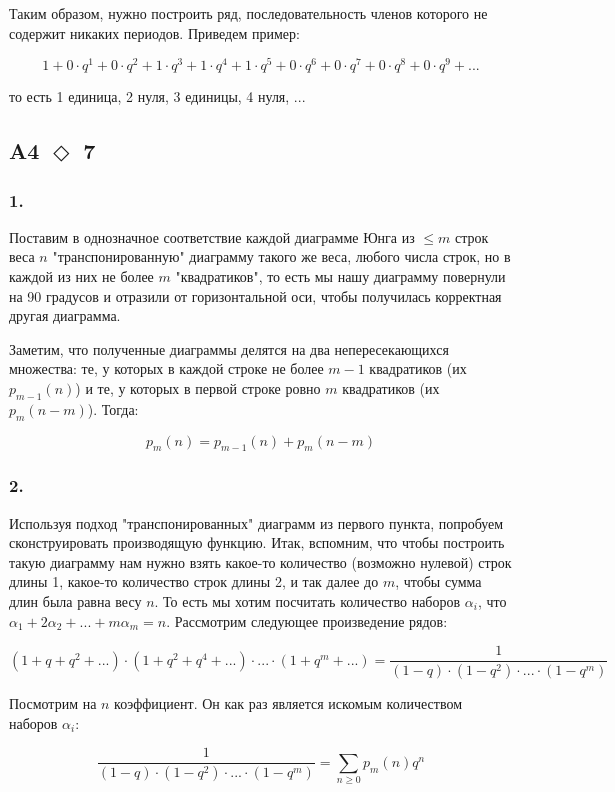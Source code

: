 \documentclass[a4paper]{article}
\newcommand{\task}[2]{A#1 $\Diamond$ #2}
\begin{document}
  Таким образом, нужно построить ряд, последовательность членов которого не содержит никаких периодов. Приведем пример:

  $$1 + 0 \cdot q^1 + 0 \cdot q^2 + 1 \cdot q^3 + 1 \cdot q^4 + 1 \cdot q^5 + 0 \cdot q^6 + 0 \cdot q^7 + 0 \cdot q^8 + 0 \cdot q^9 + ...$$

  то есть 1 единица, 2 нуля, 3 единицы, 4 нуля, ...

  \subsection*{\task{4}{7}}
  \subsubsection*{1.}
  Поставим в однозначное соответствие каждой диаграмме Юнга из $\le m$ строк веса $n$ "транспонированную" диаграмму такого же веса, любого числа строк, но в каждой из них не более $m$ "квадратиков", то есть мы нашу диаграмму повернули на 90 градусов и отразили от горизонтальной оси, чтобы получилась корректная другая диаграмма.

  Заметим, что полученные диаграммы делятся на два непересекающихся множества: те, у которых в каждой строке не более $m - 1$ квадратиков (их $p_{m - 1}(n)$) и те, у которых в первой строке ровно $m$ квадратиков (их $p_m(n - m)$). Тогда:

  $$p_m(n) = p_{m - 1}(n) + p_{m}(n - m)$$
  \subsubsection*{2.}
  Используя подход "транспонированных" диаграмм из первого пункта, попробуем сконструировать производящую функцию. Итак, вспомним, что чтобы построить такую диаграмму нам нужно взять какое-то количество (возможно нулевой) строк длины 1, какое-то количество строк длины 2, и так далее до $m$, чтобы сумма длин была равна весу $n$. То есть мы хотим посчитать количество наборов $\alpha_i$, что $\alpha_1 + 2 \alpha_2 + ... + m \alpha_m = n$. Рассмотрим следующее произведение рядов:

  $$(1 + q + q^2 + ...) \cdot (1 + q^2 + q^4 + ...) \cdot ... \cdot (1 + q^m + ...) = \frac{1}{(1 - q)\cdot(1 - q^2)\cdot ... \cdot (1 - q^m)}$$

  Посмотрим на $n$ коэффициент. Он как раз является искомым количеством наборов $\alpha_i$:

  $$
  \frac{1}{(1 - q)\cdot(1 - q^2)\cdot ... \cdot (1 - q^m)} = \sum_{n \ge 0} p_m(n)q^n
  $$
\end{document}
